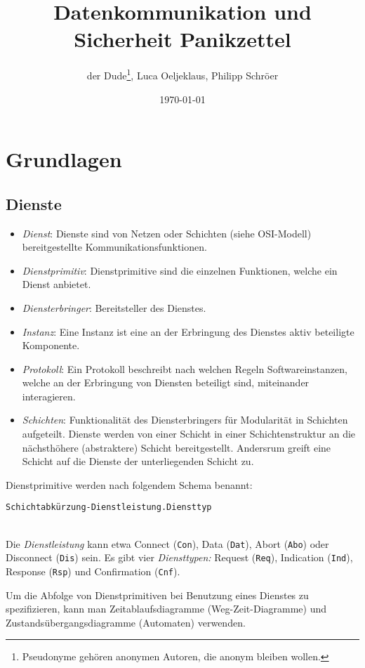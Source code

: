 \documentclass[a4paper,parskip=half*,DIV=15,fontsize=11pt]{scrartcl}
\title{Datenkommunikation und Sicherheit Panikzettel}
\author{der Dude\footnote{Pseudonyme gehören anonymen Autoren, die anonym bleiben wollen.}, Luca Oeljeklaus, Philipp Schröer}
\date{\today}
\begin{document}
\maketitle

\tableofcontents

\section{Grundlagen}
\subsection{Dienste}
\begin{itemize}
    \item \emph{Dienst}: Dienste sind von Netzen oder Schichten (siehe OSI-Modell) bereitgestellte Kommunikationsfunktionen.
    \item \emph{Dienstprimitiv}: Dienstprimitive sind die einzelnen Funktionen, welche ein Dienst anbietet.
    \item \emph{Diensterbringer}: Bereitsteller des Dienstes.
    \item \emph{Instanz}: Eine Instanz ist eine an der Erbringung des Dienstes aktiv beteiligte Komponente.
    \item \emph{Protokoll}: Ein Protokoll beschreibt nach welchen Regeln Softwareinstanzen, welche an der Erbringung von Diensten beteiligt sind, miteinander interagieren.
    \item \emph{Schichten}: Funktionalität des Diensterbringers für Modularität in Schichten aufgeteilt. Dienste werden von einer Schicht in einer Schichtenstruktur an die nächsthöhere (abstraktere) Schicht bereitgestellt. Andersrum greift eine Schicht auf die Dienste der unterliegenden Schicht zu.
\end{itemize}

Dienstprimitive werden nach folgendem Schema benannt:\\
\centerline{\lstinline{Schichtabkürzung-Dienstleistung.Diensttyp}} \\
Die \emph{Dienstleistung} kann etwa Connect (\lstinline{Con}), Data (\lstinline{Dat}), Abort (\lstinline{Abo}) oder Disconnect (\lstinline{Dis}) sein. Es gibt vier \emph{Diensttypen:} Request (\lstinline{Req}), Indication (\lstinline{Ind}), Response (\lstinline{Rsp}) und Confirmation (\lstinline{Cnf}).

Um die Abfolge von Dienstprimitiven bei Benutzung eines Dienstes zu spezifizieren, kann man Zeitablaufsdiagramme (Weg-Zeit-Diagramme) und Zustandsübergangsdiagramme (Automaten) verwenden.
\end{document}
